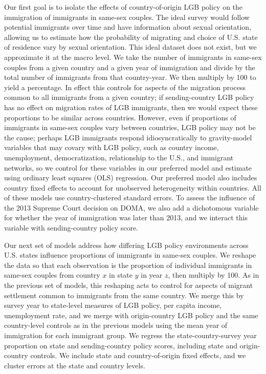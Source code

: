 \documentclass[
  11pt,
]{article}
\begin{document}
Our first goal is to isolate the effects of country-of-origin LGB policy on the immigration of immigrants in same-sex couples. The ideal survey would follow potential immigrants over time and have information about sexual orientation, allowing us to estimate how the probability of migrating and choice of U.S. state of residence vary by sexual orientation. This ideal dataset does not exist, but we approximate it at the macro level. We take the number of immigrants in same-sex couples from a given country and a given year of immigration and divide by the total number of immigrants from that country-year. We then multiply by 100 to yield a percentage. In effect this controls for aspects of the migration process common to all immigrants from a given country; if sending-country LGB policy has no effect on migration rates of LGB immigrants, then we would expect these proportions to be similar across countries. However, even if proportions of immigrants in same-sex couples vary between countries, LGB policy may not be the cause; perhaps LGB immigrants respond idiosyncratically to gravity-model variables that may covary with LGB policy, such as country income, unemployment, democratization, relationship to the U.S., and immigrant networks, so we control for these variables in our preferred model and estimate using ordinary least squares (OLS) regression. Our preferred model also includes country fixed effects to account for unobserved heterogeneity within countries. All of these models use country-clustered standard errors. To assess the influence of the 2013 Supreme Court decision on DOMA, we also add a dichotomous variable for whether the year of immigration was later than 2013, and we interact this variable with sending-country policy score.

Our next set of models address how differing LGB policy environments across U.S. states influence proportions of immigrants in same-sex couples. We reshape the data so that each observation is the proportion of individual immigrants in same-sex couples from country \(x\) in state \(y\) in year \(z\), then multiply by 100. As in the previous set of models, this reshaping acts to control for aspects of migrant settlement common to immigrants from the same country. We merge this by survey year to state-level measures of LGB policy, per capita income, unemployment rate, and we merge with origin-country LGB policy and the same country-level controls as in the previous models using the mean year of immigration for each immigrant group. We regress the state-country-survey year proportion on state and sending-country policy scores, including state and origin-country controls. We include state and country-of-origin fixed effects, and we cluster errors at the state and country levels.
\end{document}
